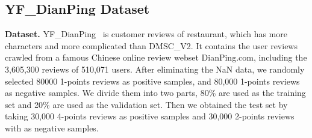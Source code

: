 

\subsection{YF\_DianPing Dataset}
\label{sec:yf_dianping}

\textbf{Dataset.}
YF\_DianPing~\cite{DianpingData} is customer reviews of restaurant, which has more characters and more complicated than DMSC\_V2.
It contains the user reviews crawled from a famous Chinese online review webset DianPing.com, including the 3,605,300 reviews of 510,071 users. After eliminating the NaN data, we randomly selected 80000 1-points reviews as positive samples, and 80,000 1-points reviews as negative samples.  We divide  them  into  two  parts, 80\% are used as the training set and 20\% are used as the validation set. Then we obtained the test set by taking 30,000 4-points reviews as positive samples and 30,000 2-points reviews with as negative samples. 

